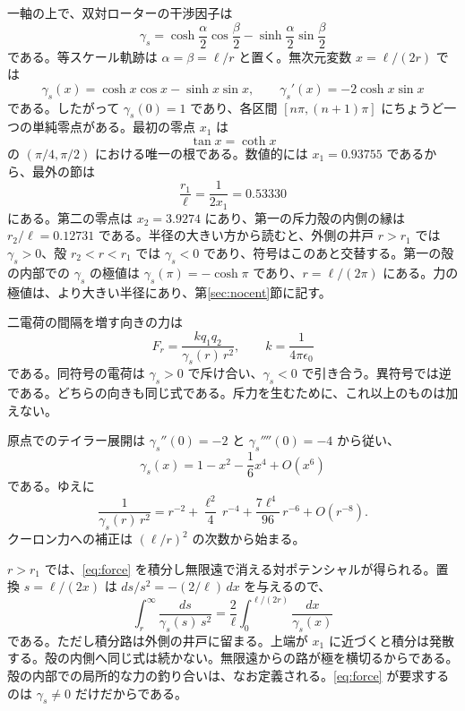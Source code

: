 \documentclass[a4paper]{article}
\begin{document}
一軸の上で、双対ローターの干渉因子は
\[
\gamma_s
  =\cosh\frac{\alpha}{2}\cos\frac{\beta}{2}
  -\sinh\frac{\alpha}{2}\sin\frac{\beta}{2}
\]
である。等スケール軌跡は \(\alpha=\beta=\ell/r\) と置く。無次元変数 \(x=\ell/(2r)\) では
\begin{equation}
\label{eq:gamma}
\gamma_s(x)=\cosh x\cos x-\sinh x\sin x,
\qquad
\gamma_s'(x)=-2\cosh x\sin x
\end{equation}
である。したがって \(\gamma_s(0)=1\) であり、各区間 \([n\pi,(n+1)\pi]\) にちょうど一つの単純零点がある。最初の零点 \(x_1\) は
\begin{equation}
\label{eq:node}
\tan x=\coth x
\end{equation}
の \((\pi/4,\pi/2)\) における唯一の根である。数値的には \(x_1=0.93755\) であるから、最外の節は
\[
\frac{r_1}{\ell}=\frac{1}{2x_1}=0.53330
\]
にある。第二の零点は \(x_2=3.9274\) にあり、第一の斥力殻の内側の縁は \(r_2/\ell=0.12731\) である。半径の大きい方から読むと、外側の井戸 \(r>r_1\) では \(\gamma_s>0\)、殻 \(r_2<r<r_1\) では \(\gamma_s<0\) であり、符号はこのあと交替する。第一の殻の内部での \(\gamma_s\) の極値は \(\gamma_s(\pi)=-\cosh\pi\) であり、\(r=\ell/(2\pi)\) にある。力の極値は、より大きい半径にあり、第\ref{sec:nocent}節に記す。

二電荷の間隔を増す向きの力は
\begin{equation}
\label{eq:force}
F_r=\frac{k q_1 q_2}{\gamma_s(r)\,r^{2}},
\qquad
k=\frac{1}{4\pi\epsilon_0}
\end{equation}
である。同符号の電荷は \(\gamma_s>0\) で斥け合い、\(\gamma_s<0\) で引き合う。異符号では逆である。どちらの向きも同じ式である。斥力を生むために、これ以上のものは加えない。

原点でのテイラー展開は \(\gamma_s''(0)=-2\) と \(\gamma_s''''(0)=-4\) から従い、
\begin{equation}
\label{eq:series}
\gamma_s(x)=1-x^{2}-\frac16 x^{4}+O(x^{6})
\end{equation}
である。ゆえに
\[
\frac{1}{\gamma_s(r)\,r^{2}}
  =r^{-2}+\frac{\ell^{2}}{4}\,r^{-4}+\frac{7\ell^{4}}{96}\,r^{-6}+O(r^{-8}).
\]
クーロン力への補正は \((\ell/r)^{2}\) の次数から始まる。

\(r>r_1\) では、\eqref{eq:force} を積分し無限遠で消える対ポテンシャルが得られる。置換 \(s=\ell/(2x)\) は \(ds/s^{2}=-(2/\ell)\,dx\) を与えるので、
\begin{equation}
\label{eq:potential}
\int_r^{\infty}\frac{ds}{\gamma_s(s)\,s^{2}}
  =\frac{2}{\ell}\int_0^{\ell/(2r)}\frac{dx}{\gamma_s(x)}
\end{equation}
である。ただし積分路は外側の井戸に留まる。上端が \(x_1\) に近づくと積分は発散する。殻の内側へ同じ式は続かない。無限遠からの路が極を横切るからである。殻の内部での局所的な力の釣り合いは、なお定義される。\eqref{eq:force} が要求するのは \(\gamma_s\neq 0\) だけだからである。
\end{document}
